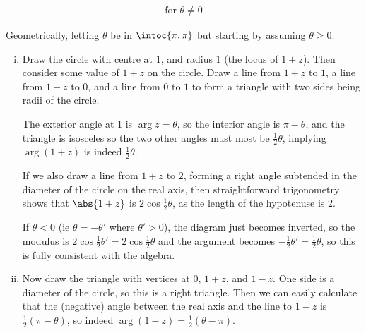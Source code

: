 \documentclass[fleqn,a4paper,11pt]{article}
\begin{document}
\begin{enumerate}
\begin{enumerate}[(i)]
\begin{align*}
                    \text{for \(\theta \ne 0\)}
      \end{align*}
    \end{enumerate}
    Geometrically, letting \(\theta\) be in \(\intoc{\pi, \pi}\) but starting by
    assuming \(\theta \ge 0\):
    \begin{enumerate}[(i)]
     \item
      Draw the circle with centre at \(1\), and radius \(1\) (the locus of
      \(1 + z\)). Then consider some value of \(1 + z\) on the circle. Draw a
      line from \(1 + z\) to \(1\), a line from \(1 + z\) to \(0\), and a line
      from \(0\) to \(1\) to form a triangle with two sides being radii of the
      circle.

      The exterior angle at \(1\) is \(\arg z = \theta\), so the
      interior angle is \(\pi - \theta\), and the triangle is isosceles so the
      two other angles must most be \(\frac 12 \theta\), implying
      \(\arg(1 + z)\) is indeed \(\frac 12 \theta\).

      If we also draw a line from \(1 + z\) to \(2\), forming a right angle
      subtended in the diameter of the circle on the real axis, then
      straightforward trigonometry shows that \(\abs{1 + z}\) is
      \(2 \cos \frac 12 \theta\), as the length of the hypotenuse is \(2\).

      If \(\theta < 0\) (ie \(\theta = -\theta'\) where \(\theta' > 0\)), the
      diagram just becomes inverted, so the modulus is
      \(2 \cos \frac 12 \theta' = 2 \cos \frac 12 \theta\) and the
      argument becomes \(-\frac 12 \theta' = \frac 12 \theta\), so this is fully
      consistent with the algebra.
     \item
      Now draw the triangle with vertices at \(0\), \(1 + z\), and \(1 - z\).
      One side is a diameter of the circle, so this is a right triangle. Then we
      can easily calculate that the (negative) angle between the real axis and
      the line to \(1 - z\) is \(\frac 12 (\pi - \theta)\), so indeed
      \(\arg(1 - z) = \frac 12 (\theta - \pi)\).


\end{enumerate}
\end{enumerate}
\end{document}

